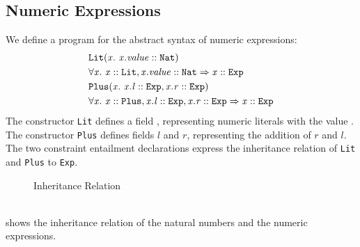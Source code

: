 \subsection{Numeric Expressions}
We define a program for the abstract syntax of numeric expressions:
%
\begin{align*}
&\mathit{\texttt{Lit}}(\mathit{x}.\ \mathit{\mathit{x.value} :: \mathit{\texttt{Nat}}})\\
& \forall \mathit{x}.\ \mathit{\mathit{x} :: \mathit{\texttt{Lit}}, \mathit{x.value} :: \mathit{\texttt{Nat}}} \Rightarrow \mathit{\mathit{x} :: \mathit{\texttt{Exp}}}\\
&\mathit{\texttt{Plus}}(\mathit{x}.\ \mathit{\mathit{x.l} :: \mathit{\texttt{Exp}}, \mathit{x.r} :: \mathit{\texttt{Exp}}})\\
& \forall \mathit{x}.\ \mathit{\mathit{x} :: \mathit{\texttt{Plus}}, \mathit{x.l} :: \mathit{\texttt{Exp}}, \mathit{x.r} :: \mathit{\texttt{Exp}}} \Rightarrow \mathit{\mathit{x} :: \mathit{\texttt{Exp}}}
\end{align*}
%
The constructor \texttt{Lit} defines a field ,
representing numeric literals with the value .
The constructor \texttt{Plus} defines fields $l$ and $r$,
representing the addition of $r$ and $l$.
The two constraint entailment declarations express
the inheritance relation of
\texttt{Lit} and \texttt{Plus} to \texttt{Exp}.

\begin{figure}[h]
\begin{center}
\end{center}
\caption{Inheritance Relation}
\label{fig:aexp-inheritance}
\end{figure}\quad\\
 shows the
inheritance relation of the natural numbers
and the numeric expressions.

